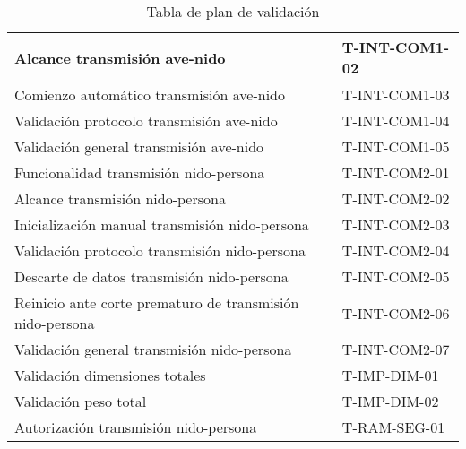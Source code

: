 \begin{table}[H]
\begin{tabular}{|l|l|}
Alcance transmisión ave-nido                                         & T-INT-COM1-02                             \\ \hline
Comienzo automático transmisión ave-nido                             & T-INT-COM1-03                             \\ \hline
Validación protocolo transmisión ave-nido                            & T-INT-COM1-04                             \\ \hline
Validación general transmisión ave-nido                              & T-INT-COM1-05                             \\ \hline
Funcionalidad transmisión nido-persona                               & T-INT-COM2-01                             \\ \hline
Alcance transmisión nido-persona                                     & T-INT-COM2-02                             \\ \hline
Inicialización manual transmisión nido-persona                       & T-INT-COM2-03                             \\ \hline
Validación protocolo transmisión nido-persona                        & T-INT-COM2-04                             \\ \hline
Descarte de datos transmisión nido-persona                           & T-INT-COM2-05                             \\ \hline
Reinicio ante corte prematuro de transmisión nido-persona            & T-INT-COM2-06                             \\ \hline
Validación general transmisión nido-persona                          & T-INT-COM2-07                             \\ \hline
Validación dimensiones totales                                       & T-IMP-DIM-01                              \\ \hline
Validación peso total                                                & T-IMP-DIM-02                              \\ \hline
Autorización transmisión nido-persona                                & T-RAM-SEG-01                              \\ \hline
\end{tabular}
\caption{Tabla de plan de validación}
\end{table}